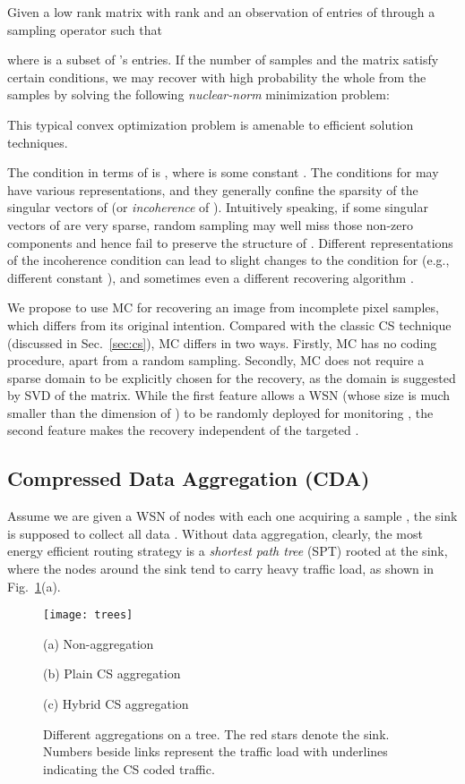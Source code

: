 \documentclass[conference]{IEEEtran}
\begin{document}
    Given a low rank matrix  with rank  and an observation of  entries of  through a sampling operator  such that
    
where  is a subset of 's entries. If the number of samples  and the matrix  satisfy certain conditions, we may recover with high probability the whole  from the  samples by solving the following \textit{nuclear-norm} minimization problem:
    
This typical convex optimization problem is amenable to efficient solution techniques.

    The condition in terms of  is , where  is some constant \cite{CandesP-ProcIEEE10}. The conditions for  may have various representations, and they generally confine the sparsity of the singular vectors of  (or \textit{incoherence} of ). Intuitively speaking, if some singular vectors of  are very sparse, random sampling may well miss those non-zero components and hence fail to preserve the structure of . Different representations of the incoherence condition can lead to slight changes to the condition for  (e.g., different constant ), and sometimes even a different recovering algorithm \cite{CandesP-ProcIEEE10}.

    We propose to use MC for recovering an image  from incomplete pixel samples, which differs from its original intention. Compared with the classic CS technique (discussed in Sec.~\ref{sec:cs}), MC differs in two ways. Firstly, MC has no coding procedure, apart from a random sampling. Secondly, MC does not require a sparse domain to be explicitly chosen for the recovery, as the domain is suggested by SVD of the matrix. While the first feature allows a WSN (whose size is much smaller than the dimension of ) to be randomly deployed for monitoring , the second feature makes the recovery independent of the targeted .

  \subsection{Compressed Data Aggregation (CDA)} \label{sec:csrt}
Assume we are given a WSN of  nodes with each one acquiring a sample , the sink is supposed to collect all data . Without data aggregation, clearly, the most energy efficient routing strategy is a \textit{shortest path tree} (SPT) rooted at the sink, where the nodes around the sink tend to carry heavy traffic load, as shown in Fig.~\ref{fig:aggtrees}(a).
    \begin{figure}[htb]
      \centering
      \texttt{[image: trees]}
      \parbox{.3\columnwidth}{\center\scriptsize(a) Non-aggregation}
      \parbox{.33\columnwidth}{\center\scriptsize(b) Plain CS aggregation}
      \parbox{.33\columnwidth}{\center\scriptsize(c) Hybrid CS aggregation}
      \caption{Different aggregations on a tree. The red stars denote the sink. Numbers beside links represent the traffic load with underlines indicating the CS coded traffic.}
      \label{fig:aggtrees}
    \end{figure}
\end{document}

